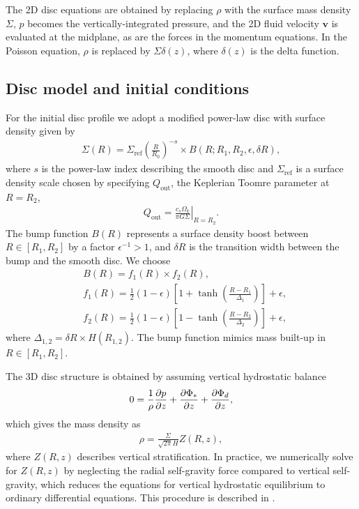
The 2D disc equations are obtained by replacing $\rho$ with the surface
mass density $\Sigma$, $p$ becomes the vertically-integrated pressure, 
and the 2D fluid velocity $\bm{v}$ is evaluated at the midplane, as are
the forces in the momentum equations. In the Poisson equation, $\rho$ is
replaced by $\Sigma\delta(z)$, where $\delta(z)$ is the
delta function. 

\subsection{Disc model and initial conditions}
For the initial disc profile we adopt a modified power-law disc with
surface density given by
\begin{align}
  \Sigma(R) = \Sigma_\mathrm{ref} \left(\frac{R}{R_0}\right)^{-s}\times B(R;
  R_{1}, R_{2}, \epsilon, \delta R), 
\end{align}
where $s$ is the power-law index describing the smooth disc and
$\Sigma_\mathrm{ref}$ is a 
surface density scale chosen by specifying $Q_\mathrm{out}$,
the Keplerian Toomre parameter at $R=R_{2}$,
\begin{align}
  Q_\mathrm{out} = \left.\frac{c_s\Omega_k}{\pi G
    \Sigma}\right|_{R=R_{2}}. 
\end{align}
The bump function
$B(R)$ represents a surface density boost between
$R\in[R_{1},R_{2}]$ by a factor $\epsilon^{-1}>1$,
and $\delta R$ is the transition width between the bump and the
smooth disc. We choose 
\begin{align}
  &B(R) = f_1(R)\times f_2(R),\\
  &f_1(R) = \frac{1}{2}\left(1 - \epsilon\right)\left[1 +
    \tanh\left(\frac{R-R_{1}}{\Delta_1}\right)\right]  + \epsilon,\\
  &f_2(R) = \frac{1}{2}\left(1 - \epsilon\right)\left[1 -
    \tanh\left(\frac{R-R_{2}}{\Delta_2}\right)\right]  + \epsilon,
\end{align}
where $\Delta_{1,2} = \delta R \times H(R_{1,2})$. The bump function
mimics mass built-up in $R\in[R_1,R_2]$. 

The 3D disc structure is obtained by assuming vertical hydrostatic
balance  
\begin{align}
  0 = \frac{1}{\rho}\frac{\partial p}{\partial z} + \frac{\partial\Phi_*}{\partial z} + \frac{\partial
    \Phi_d}{\partial z},  
\end{align}
which gives the mass density as 
\begin{align}
  \rho = \frac{\Sigma}{\sqrt{2\pi}H}Z(R,z),
\end{align}
where $Z(R,z)$ describes vertical stratification. In practice, we
numerically solve for $Z(R,z)$ by neglecting the radial self-gravity
force compared to vertical self-gravity, which reduces the equations
for vertical hydrostatic equilibrium to ordinary differential
equations. This procedure is described in \cite{lin12b}. 


